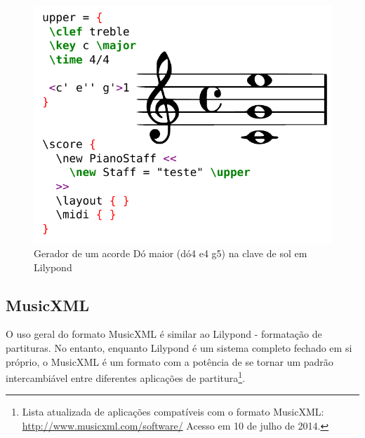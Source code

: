 \documentclass[
	12pt,				%
	openright,			%
	twoside,			%
	a4paper,			%
	english,			%
	french,				%
	spanish,			%
	brazil				%
	]{abntex2}
\begin{document}
\begin{figure}[htb]
	\caption{\label{fig_grafico}Gerador de um acorde Dó maior (dó4 e4 g5) na clave de sol em Lilypond}
	\begin{center}
	    \includegraphics[scale=0.75]{score/lilypond.pdf}
	\end{center}
\end{figure}


\subsection{MusicXML}

O uso geral do formato MusicXML é similar ao Lilypond - formatação de partituras. No entanto, enquanto Lilypond é um sistema completo fechado em si próprio, o MusicXML é um formato com a potência de se tornar um padrão intercambiável entre diferentes aplicações de partitura\footnote{ Lista atualizada de aplicações compatíveis com o formato MusicXML: \url{http://www.musicxml.com/software/} Acesso em 10 de julho de 2014.}.
\end{document}
